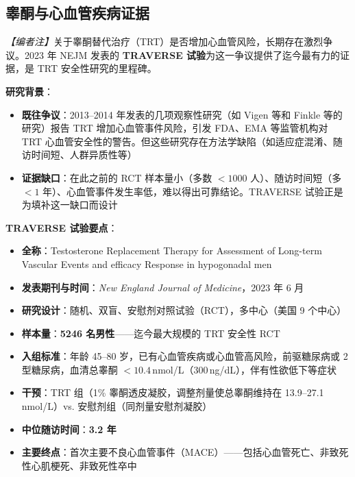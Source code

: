 \subsection{睾酮与心血管疾病证据}
\label{subsec:traverse_trial}

\noindent\textit{【编者注】}关于睾酮替代治疗（TRT）是否增加心血管风险，长期存在激烈争议。2023 年 NEJM 发表的 \textbf{TRAVERSE 试验}为这一争议提供了迄今最有力的证据，是 TRT 安全性研究的里程碑。

\vspace{0.5em}
\noindent\textbf{研究背景}：

\begin{itemize}[leftmargin=2cm]
	\item \textbf{既往争议}：2013--2014 年发表的几项观察性研究（如 Vigen 等和 Finkle 等的研究）报告 TRT 增加心血管事件风险，引发 FDA、EMA 等监管机构对 TRT 心血管安全性的警告。但这些研究存在方法学缺陷（如适应症混淆、随访时间短、人群异质性等）
	\item \textbf{证据缺口}：在此之前的 RCT 样本量小（多数 $<1000$ 人）、随访时间短（多 $<1$ 年）、心血管事件发生率低，难以得出可靠结论。TRAVERSE 试验正是为填补这一缺口而设计
\end{itemize}

\vspace{0.5em}
\noindent\textbf{TRAVERSE 试验要点}：

\begin{itemize}[leftmargin=2cm]
	\item \textbf{全称}：Testosterone Replacement Therapy for Assessment of Long-term Vascular Events and efficacy Response in hypogonadal men
	\item \textbf{发表期刊与时间}：\textit{New England Journal of Medicine}，2023 年 6 月
	\item \textbf{研究设计}：随机、双盲、安慰剂对照试验（RCT），多中心（美国 9 个中心）
	\item \textbf{样本量}：\textbf{5246 名男性}——迄今最大规模的 TRT 安全性 RCT
	\item \textbf{入组标准}：年龄 45--80 岁，已有心血管疾病或心血管高风险，前驱糖尿病或 2 型糖尿病，血清总睾酮 $<10.4\,$nmol/L（300\,ng/dL），伴有性欲低下等症状
	\item \textbf{干预}：TRT 组（1\% 睾酮透皮凝胶，调整剂量使总睾酮维持在 13.9--27.1\,nmol/L）vs. 安慰剂组（同剂量安慰剂凝胶）
	\item \textbf{中位随访时间}：\textbf{3.2 年}
	\item \textbf{主要终点}：首次主要不良心血管事件（MACE）——包括心血管死亡、非致死性心肌梗死、非致死性卒中
\end{itemize}

